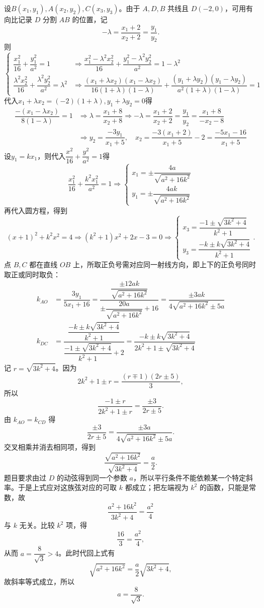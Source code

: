 \begin{solution}
    设$B(x_1,y_1),A(x_2,y_2),C(x_3,y_3)$。由于 $A,D,B$ 共线且 $D(-2,0)$，可用有向比记录 $D$ 分割 $AB$ 的位置，记
    \[
    -\lambda=\dfrac{x_1+2}{x_2+2}=\dfrac{y_1}{y_2}.
    \]
    则
    \[\begin{cases}\dfrac{x_1^2}{16}+\dfrac{y_1^2}{a^2}=1&\Rightarrow \dfrac{x_1^2-\lambda^2x_2^2}{16}+\dfrac{y_1^2-\lambda^2y_2^2}{a^2}=1-\lambda^2\\[1.2ex]\dfrac{\lambda^2x_2^2}{16}+\dfrac{\lambda^2y_2^2}{a^2}=\lambda^2&\Rightarrow \dfrac{(x_1+\lambda x_2)(x_1-\lambda x_2)}{16(1+\lambda)(1-\lambda)}+\dfrac{(y_1+\lambda y_2)(y_1-\lambda y_2)}{a^2(1+\lambda)(1-\lambda)}=1\end{cases}\]
    代入$x_1+\lambda x_2=(-2)(1+\lambda),y_1+\lambda y_2=0$得
    \begin{align*}\dfrac{-(x_1-\lambda x_2)}{8(1-\lambda)}=1&\Rightarrow \lambda=\dfrac{x_1+8}{x_2+8}\Rightarrow -\lambda=\dfrac{x_1+2}{x_2+2}=\dfrac{y_1}{y_2}=\dfrac{x_1+8}{-x_2-8}\\
    &\Rightarrow y_2=\dfrac{-3y_1}{x_1+5},\quad x_2=\dfrac{-3(x_1+2)}{x_1+5}-2=\dfrac{-5x_1-16}{x_1+5}
\end{align*}
设$y_1=kx_1$，则代入$\dfrac{x^2}{16}+\dfrac{y^2}{a^2}=1$得
\[
\dfrac{x_1^2}{16}+\dfrac{k^2x_1^2}{a^2}=1\Rightarrow \begin{cases}x_1=\pm\dfrac{4a}{\sqrt{a^2+16k^2}}\\[1.2ex]y_1=\pm\dfrac{4ak}{\sqrt{a^2+16k^2}}\end{cases}
\]
再代入圆方程，得到
\[
(x+1)^2+k^2x^2=4\Rightarrow (k^2+1)x^2+2x-3=0\Rightarrow \begin{cases}x_3=\dfrac{-1\pm\sqrt{3k^2+4}}{k^2+1}\\y_3=\dfrac{-k\pm k\sqrt{3k^2+4}}{k^2+1}\end{cases}.
\]
点 $B,C$ 都在直线 $OB$ 上，所取正负号需对应同一射线方向，即上下的正负号同时取正或同时取负：
\begin{align*}
    k_{AO}&=\dfrac{3y_1}{5x_1+16}=\dfrac{\dfrac{\pm 12ak}{\sqrt{a^2+16k^2}}}{\pm\dfrac{20a}{\sqrt{a^2+16k^2}}+16}=\dfrac{\pm 3ak}{4\sqrt{a^2+16k^2}\pm 5a}\\[1.2ex]
    k_{DC}&=\dfrac{\dfrac{-k\pm k\sqrt{3k^2+4}}{k^2+1}}{\dfrac{-1\pm\sqrt{3k^2+4}}{k^2+1}+2}=\dfrac{-k\pm k\sqrt{3k^2+4}}{2k^2+1\pm \sqrt{3k^2+4}}
\end{align*}
记 $r=\sqrt{3k^2+4}$。因为
\[
2k^2+1\pm r=\frac{(r\mp1)(2r\pm5)}3,
\]
所以
\[
\frac{-1\pm r}{2k^2+1\pm r}=\frac{\pm3}{2r\pm5}.
\]
由 $k_{AO}=k_{CD}$ 得
\[
\frac{\pm3}{2r\pm5}=\frac{\pm3a}{4\sqrt{a^2+16k^2}\pm5a}.
\]
交叉相乘并消去相同项，得到
\[
\frac{\sqrt{a^2+16k^2}}{\sqrt{3k^2+4}}=\frac a2.
\]
题目要求由过 $D$ 的动弦得到同一个参数 $a$，所以平行条件不能依赖某一个特定斜率。于是上式应对这族弦对应的可取 $k$ 都成立；把左端视为 $k^2$ 的函数，只能是常数，故
\[
\frac{a^2+16k^2}{3k^2+4}=\frac{a^2}{4}
\]
与 $k$ 无关。比较 $k^2$ 项，得
\[
\frac{16}{3}=\frac{a^2}{4},
\]
从而 $a=\dfrac{8}{\sqrt{3}}>4$。此时代回上式有
\[
\sqrt{a^2+16k^2}=\frac a2\sqrt{3k^2+4},
\]
故斜率等式成立，所以
\[
a=\dfrac{8}{\sqrt{3}}.
\]
\end{solution}
